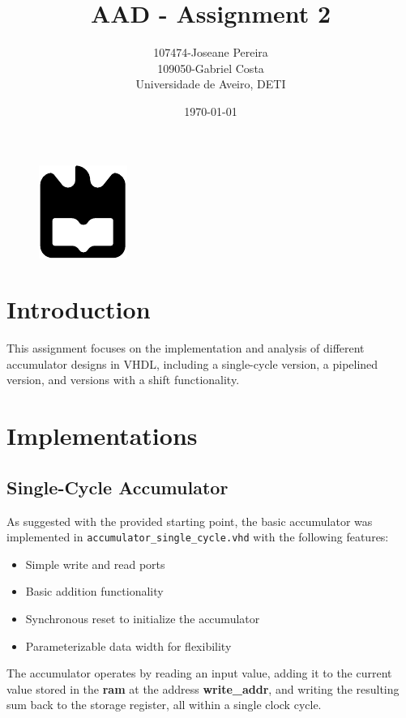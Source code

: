 \documentclass[a4paper,12pt]{article}
\title{AAD - Assignment 2}
\author{107474-Joseane Pereira \\
109050-Gabriel Costa \\
Universidade de Aveiro, DETI}
\date{\today}
\begin{document}
\begin{figure}
    \centering
    \includegraphics[width=0.3\linewidth]{ua.pdf}
    \label{fig:enter-label}
\end{figure}
\maketitle
\newpage
\tableofcontents
\newpage
\section{Introduction}
This assignment focuses on the implementation and analysis of different 
accumulator designs in VHDL, including a single-cycle version, a pipelined 
version, and versions with a shift functionality.


\section{Implementations}

\subsection{Single-Cycle Accumulator}
As suggested with the provided starting point, the basic accumulator was implemented in
\texttt{accumulator\_single\_cycle.vhd} with the following features:
\begin{itemize}
    \item Simple write and read ports
    \item Basic addition functionality
    \item Synchronous reset to initialize the accumulator
    \item Parameterizable data width for flexibility
\end{itemize}

The accumulator operates by reading an input value, adding it to the current value stored in the \textbf{ram} at the address \textbf{write\_addr}, and writing the resulting sum back to the storage register, all within a single clock cycle.
\end{document}
